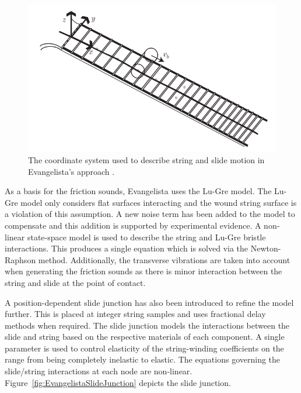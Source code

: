 \documentclass[main.tex]{subfiles}
\begin{document}
\begin{figure}[h]
    \centering
    \includegraphics[scale=.65]{./images/diagrams/EvangelistaCoordinateSystem.png}
    \caption{The coordinate system used to describe string and slide motion in Evangelista's approach .}
    \label{fig:EvangelistaCoordinateSystem}
\end{figure}

As a basis for the friction sounds, Evangelista uses the Lu-Gre model. The Lu-Gre model only considers flat surfaces interacting and the wound string surface is a violation of this assumption. A new noise term has been added to the model to compensate and this addition is supported by experimental evidence. A non-linear state-space model is used to describe the string and Lu-Gre bristle interactions. This produces a single equation which is solved via the Newton-Raphson method. Additionally, the transverse vibrations are taken into account when generating the friction sounds as there is minor interaction between the string and slide at the point of contact.

A position-dependent slide junction has also been introduced to refine the model further. This is placed at integer string samples and uses fractional delay methods when required. The slide junction models the interactions between the slide and string based on the respective materials of each component. A single parameter is used to control elasticity of the string-winding coefficients on the range from being completely inelastic to elastic. The equations governing the slide/string interactions at each node are non-linear. Figure~\ref{fig:EvangelistaSlideJunction} depicts the slide junction.
\end{document}

